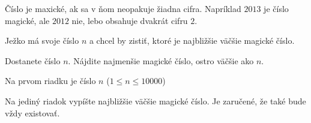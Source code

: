 




Číslo je maxické, ak sa v ňom neopakuje žiadna cifra. Napríklad $2013$ je číslo magické, ale $2012$
nie, lebo obsahuje dvakrát cifru $2$.

Ježko má svoje číslo $n$ a chcel by zistiť, ktoré je najbližšie väčšie magické číslo.


Dostanete číslo $n$. Nájdite najmenšie magické číslo, ostro väčšie ako $n$.


Na prvom riadku je číslo $n$ ($1\leq n \leq 10000$)


Na jediný riadok vypíšte najbližšie väčšie magické číslo. Je zaručené, že také bude vždy existovať.


\koniec

\koniec


